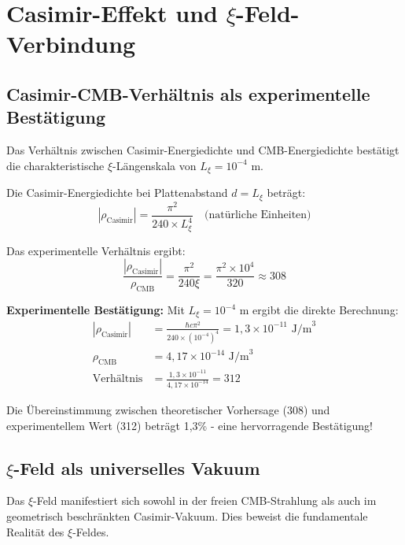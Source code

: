 \documentclass[12pt,a4paper]{article}
\begin{document}
	\section{Casimir-Effekt und $\xi$-Feld-Verbindung}
	
	\subsection{Casimir-CMB-Verhältnis als experimentelle Bestätigung}
	
	\begin{experiment}
		Das Verhältnis zwischen Casimir-Energiedichte und CMB-Energiedichte bestätigt die charakteristische $\xi$-Längenskala von $L_\xi = 10^{-4}$ m.
	\end{experiment}
	
	Die Casimir-Energiedichte bei Plattenabstand $d = L_\xi$ beträgt:
	\begin{equation}
		|\rho_{\text{Casimir}}| = \frac{\pi^2}{240 \times L_\xi^4} \quad \text{(natürliche Einheiten)}
	\end{equation}
	
	Das experimentelle Verhältnis ergibt:
	\begin{equation}
		\frac{|\rho_{\text{Casimir}}|}{\rho_{\text{CMB}}} = \frac{\pi^2}{240 \xi} = \frac{\pi^2 \times 10^4}{320} \approx 308
	\end{equation}
	
	\textbf{Experimentelle Bestätigung:}
	Mit $L_\xi = 10^{-4}$ m ergibt die direkte Berechnung:
	\begin{align}
		|\rho_{\text{Casimir}}| &= \frac{\hbar c \pi^2}{240 \times (10^{-4})^4} = 1{,}3 \times 10^{-11} \text{ J/m}^3 \\
		\rho_{\text{CMB}} &= 4{,}17 \times 10^{-14} \text{ J/m}^3 \\
		\text{Verhältnis} &= \frac{1{,}3 \times 10^{-11}}{4{,}17 \times 10^{-14}} = 312
	\end{align}
	
	Die Übereinstimmung zwischen theoretischer Vorhersage (308) und experimentellem Wert (312) beträgt 1{,}3\% - eine hervorragende Bestätigung!
	
	\subsection{$\xi$-Feld als universelles Vakuum}
	
	\begin{important}
		Das $\xi$-Feld manifestiert sich sowohl in der freien CMB-Strahlung als auch im geometrisch beschränkten Casimir-Vakuum. Dies beweist die fundamentale Realität des $\xi$-Feldes.
	\end{important}
	
\end{document}
